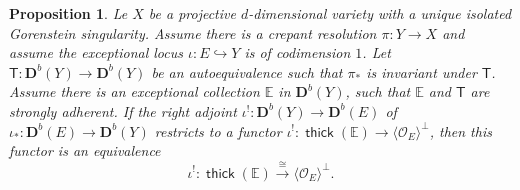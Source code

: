 \documentclass[a4paper,11pt, reqno]{amsart}
\def\E{\mathbb E}
\def\DD{\mathbf D}
\def\OO{\mathcal O}
\newcommand{\opname}[1]{\operatorname{\mathsf{#1}}}
\newcommand{\thick}{\opname{thick}\nolimits}
\def\Db{\DD^b}
\newcommand{\bT}{\mathsf{T}}
\theoremstyle{plain}
\newtheorem{proposition}[dummy]{Proposition}
\theoremstyle{definition}
\numberwithin{equation}{section}
\newlength{\arrow}
\begin{document}
\begin{proposition}\label{prop:defs-agree}
    Le $X$ be a projective $d$-dimensional variety with a unique isolated Gorenstein singularity.
    Assume there is a crepant resolution $\pi \colon Y \to X $ and assume the exceptional locus $\iota \colon E \hookrightarrow Y$ is of codimension $1$.
    Let $\bT : \Db(Y) \to \Db(Y) $ be an autoequivalence such that $\pi_\ast$ is invariant under $\bT$.
    Assume there is an exceptional collection $\E$ in $\Db(Y)$, such that $\E$ and $\bT$ are strongly adherent.
    If the right adjoint $\iota^! \colon \Db(Y) \to \Db(E)$ of $\iota_\ast \colon \Db(E) \to \Db(Y)$ restricts to a functor $\iota^! \colon \thick (   \E   ) \to  \langle \OO_E \rangle^{\perp} $, then this functor is an equivalence
    \[
    \iota^! \colon \thick (  \E  ) \xrightarrow{\cong} \langle \OO_E \rangle^{\perp} .
    \]
\end{proposition}
\end{document}
